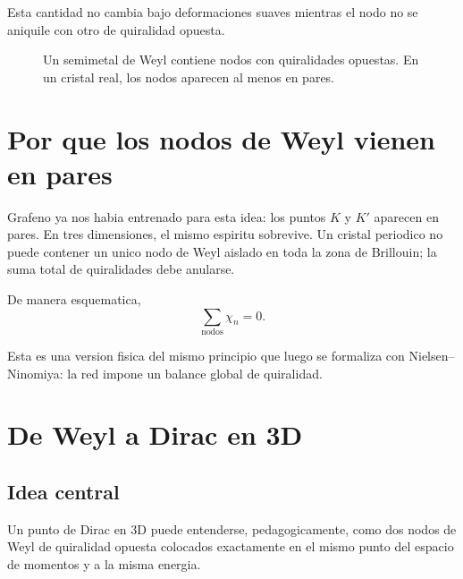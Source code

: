 Esta cantidad no cambia bajo deformaciones suaves mientras el nodo no se aniquile con otro de quiralidad opuesta.

\begin{figure}[ht]
\centering
{}
\caption{Un semimetal de Weyl contiene nodos con quiralidades opuestas. En un cristal real, los nodos aparecen al menos en pares.}
\label{c06:fig:weyl-pair}
\end{figure}

\section{Por que los nodos de Weyl vienen en pares}

Grafeno ya nos habia entrenado para esta idea: los puntos \(K\) y \(K'\) aparecen en pares. En tres dimensiones, el mismo espiritu sobrevive. Un cristal periodico no puede contener un unico nodo de Weyl aislado en toda la zona de Brillouin; la suma total de quiralidades debe anularse.

De manera esquematica,
\begin{equation}
\sum_{\text{nodos}} \chi_n = 0.
\label{c06:eq:sum-chirality}
\end{equation}

Esta es una version fisica del mismo principio que luego se formaliza con Nielsen--Ninomiya: la red impone un balance global de quiralidad.

\section{De Weyl a Dirac en 3D}

\subsection{Idea central}

Un punto de Dirac en 3D puede entenderse, pedagogicamente, como dos nodos de Weyl de quiralidad opuesta colocados exactamente en el mismo punto del espacio de momentos y a la misma energia.

